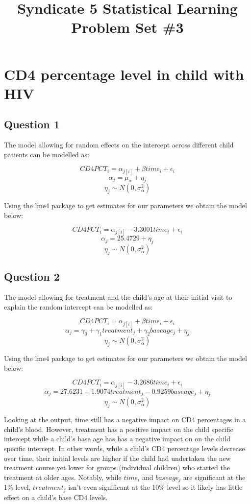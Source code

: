 \documentclass[12pt]{article}
\begin{document}
\title{Syndicate 5 Statistical Learning Problem Set \#3}
\maketitle
{\setlength{\parindent}{0cm}


\section*{CD4 percentage level in child with HIV}
\subsection*{Question 1}
The model allowing for random effects on the intercept across different child patients can be modelled as:

$$CD4PCT_i = \alpha_{j[i]} + \beta time_i + \epsilon_i$$
$$\alpha_j = \mu_\alpha + \eta_j$$
$$\eta_j \sim N(0, \sigma^2_\alpha)$$

Using the lme4 package to get estimates for our parameters we obtain the model below:

$$CD4PCT_i = \alpha_{j[i]} -3.3001 time_i + \epsilon_i$$
$$\alpha_j = 25.4729 + \eta_j$$
$$\eta_j \sim N(0, \sigma^2_\alpha)$$


\subsection*{Question 2}
The model allowing for treatment and the child's age at their initial visit to explain the random intercept can be modelled as:

$$CD4PCT_i = \alpha_{j[i]} + \beta time_i + \epsilon_i$$
$$\alpha_j = \gamma_0 + \gamma_1 treatment_j + \gamma_2 baseage_j + \eta_j$$
$$\eta_j \sim N(0, \sigma^2_\alpha)$$

Using the lme4 package to get estimates for our parameters we obtain the model below:

$$CD4PCT_i = \alpha_{j[i]} -3.2686 time_i + \epsilon_i$$
$$\alpha_j = 27.6231 + 1.9074 treatment_j -0.9259 baseage_j + \eta_j$$
$$\eta_j \sim N(0, \sigma^2_\alpha)$$

Looking at the output, time still has a negative impact on CD4 percentages in a child's blood. However, treatment has a positive impact on the child specific intercept while a child's base age has has a negative impact on on the child specific intercept. In other words, while a child's CD4 percentage levels decrease over time, their initial levels are higher if the child had undertaken the new treatment course yet lower for groups (individual children) who started the treatment at older ages. Notably, while $time_i$ and $baseage_j$ are significant at the 1\% level, $treatment_j$ isn't even significant at the 10\% level so it likely has little effect on a child's base CD4 levels.\\

}
\end{document}
